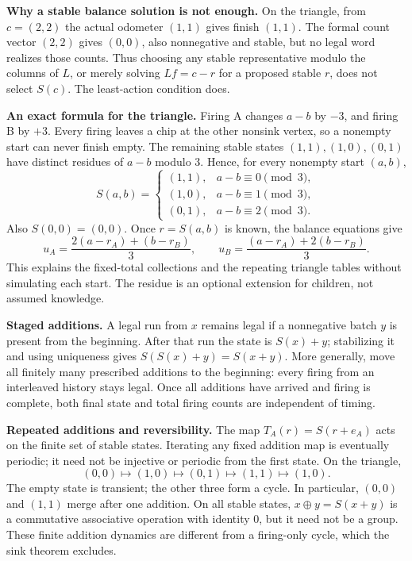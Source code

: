 \textbf{Why a stable balance solution is not enough.} On the triangle, from $c=(2,2)$ the actual odometer $(1,1)$ gives finish $(1,1)$. The formal count vector $(2,2)$ gives $(0,0)$, also nonnegative and stable, but no legal word realizes those counts. Thus choosing any stable representative modulo the columns of $L$, or merely solving $Lf=c-r$ for a proposed stable $r$, does not select $S(c)$. The least-action condition does.

\textbf{An exact formula for the triangle.} Firing A changes $a-b$ by $-3$, and firing B by $+3$. Every firing leaves a chip at the other nonsink vertex, so a nonempty start can never finish empty. The remaining stable states $(1,1),(1,0),(0,1)$ have distinct residues of $a-b$ modulo 3. Hence, for every nonempty start $(a,b)$,
\[
S(a,b)=
\begin{cases}
(1,1),&a-b\equiv0\pmod3,\\
(1,0),&a-b\equiv1\pmod3,\\
(0,1),&a-b\equiv2\pmod3.
\end{cases}
\]
Also $S(0,0)=(0,0)$. Once $r=S(a,b)$ is known, the balance equations give
\[
u_A=\frac{2(a-r_A)+(b-r_B)}3,\qquad
u_B=\frac{(a-r_A)+2(b-r_B)}3.
\]
This explains the fixed-total collections and the repeating triangle tables without simulating each start. The residue is an optional extension for children, not assumed knowledge.

\textbf{Staged additions.} A legal run from $x$ remains legal if a nonnegative batch $y$ is present from the beginning. After that run the state is $S(x)+y$; stabilizing it and using uniqueness gives $S(S(x)+y)=S(x+y)$. More generally, move all finitely many prescribed additions to the beginning: every firing from an interleaved history stays legal. Once all additions have arrived and firing is complete, both final state and total firing counts are independent of timing.

\textbf{Repeated additions and reversibility.} The map $T_A(r)=S(r+e_A)$ acts on the finite set of stable states. Iterating any fixed addition map is eventually periodic; it need not be injective or periodic from the first state. On the triangle,
\[
(0,0)\longmapsto(1,0)\longmapsto(0,1)\longmapsto(1,1)\longmapsto(1,0).
\]
The empty state is transient; the other three form a cycle. In particular, $(0,0)$ and $(1,1)$ merge after one addition. On all stable states, $x\oplus y=S(x+y)$ is a commutative associative operation with identity $0$, but it need not be a group. These finite addition dynamics are different from a firing-only cycle, which the sink theorem excludes.
